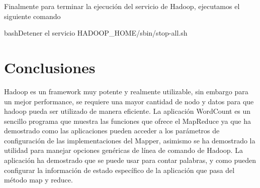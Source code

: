Finalmente para terminar la ejecución del servicio de Hadoop, ejecutamos el siguiente comando


\begin{sourcecode}[]{bash}{Detener el servicio}
HADOOP_HOME/sbin/stop-all.sh
\end{sourcecode}

\clearpage
\section{Conclusiones}

Hadoop es un framework muy potente y realmente utilizable, sin embargo para un mejor performance, se requiere una mayor cantidad de nodo y datos para que hadoop pueda ser utilizado de manera eficiente. La aplicación WordCount es un sencillo programa que muestra las funciones que ofrece el MapReduce ya que ha demostrado como las aplicaciones pueden acceder a los parámetros de configuración de las implementaciones del Mapper, asimismo se ha demostrado la utilidad para manejar opciones genéricas de línea de comando de Hadoop. La aplicación ha demostrado que se puede usar para contar palabras, y como pueden configurar la información de estado específico de la aplicación que pasa del método map y reduce.
\clearpage
 